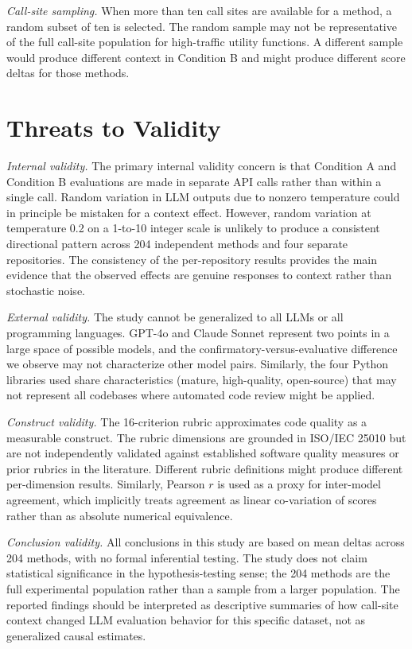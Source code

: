 \documentclass[12pt]{report}
\begin{document}
\textit{Call-site sampling.} When more than ten call sites are available for a method, a random subset of ten is selected. The random sample may not be representative of the full call-site population for high-traffic utility functions. A different sample would produce different context in Condition B and might produce different score deltas for those methods.

\section{Threats to Validity}

\textit{Internal validity.} The primary internal validity concern is that Condition A and Condition B evaluations are made in separate API calls rather than within a single call. Random variation in LLM outputs due to nonzero temperature could in principle be mistaken for a context effect. However, random variation at temperature 0.2 on a 1-to-10 integer scale is unlikely to produce a consistent directional pattern across 204 independent methods and four separate repositories. The consistency of the per-repository results provides the main evidence that the observed effects are genuine responses to context rather than stochastic noise.

\textit{External validity.} The study cannot be generalized to all LLMs or all programming languages. GPT-4o and Claude Sonnet represent two points in a large space of possible models, and the confirmatory-versus-evaluative difference we observe may not characterize other model pairs. Similarly, the four Python libraries used share characteristics (mature, high-quality, open-source) that may not represent all codebases where automated code review might be applied.

\textit{Construct validity.} The 16-criterion rubric approximates code quality as a measurable construct. The rubric dimensions are grounded in ISO/IEC 25010 but are not independently validated against established software quality measures or prior rubrics in the literature. Different rubric definitions might produce different per-dimension results. Similarly, Pearson $r$ is used as a proxy for inter-model agreement, which implicitly treats agreement as linear co-variation of scores rather than as absolute numerical equivalence.

\textit{Conclusion validity.} All conclusions in this study are based on mean deltas across 204 methods, with no formal inferential testing. The study does not claim statistical significance in the hypothesis-testing sense; the 204 methods are the full experimental population rather than a sample from a larger population. The reported findings should be interpreted as descriptive summaries of how call-site context changed LLM evaluation behavior for this specific dataset, not as generalized causal estimates.
\end{document}
